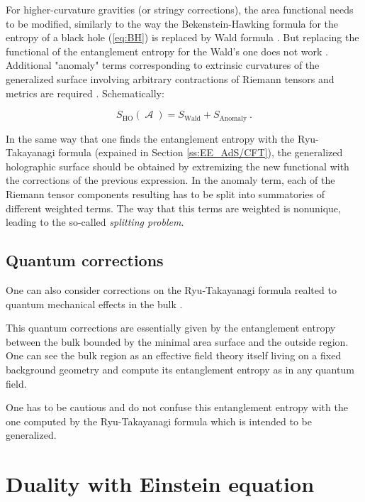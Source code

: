 \documentclass[lettersize,journal]{IEEEtran}
\providecommand{\eq}[2]{
    \begin{equation}
        #2
    \label{eq:#1}
    \end{equation}
}
\DeclareMathOperator{\calA}{\mathcal{A}}
\begin{document}
For higher-curvature gravities (or stringy corrections), the area functional needs to be modified, similarly to the way the Bekenstein-Hawking formula for the entropy of a black hole (\ref{eq:BH}) is replaced by Wald formula \cite{iyer_properties_1994}. But replacing the functional of the entanglement entropy for the Wald's one does not work \cite{bueno_holographic_2021}. Additional "anomaly" terms corresponding to extrinsic curvatures of the generalized surface involving arbitrary contractions of Riemann tensors and metrics are required \cite{dong_holographic_2014}. Schematically:
\eq{EE_HO}{
    S_{\text{HO}}(\calA) = S_{\text{Wald}} + S_{\text{Anomaly}} \ .
}

In the same way that one finds the entanglement entropy with the Ryu-Takayanagi formula (expained in Section \ref{ss:EE_AdS/CFT}), the generalized holographic surface should be obtained by extremizing the new functional with the corrections of the previous expression. In the anomaly term, each of the Riemann tensor components resulting has to be split into summatories of different weighted terms. The way that this terms are weighted is nonunique, leading to the so-called \textit{splitting problem}.


\subsection{Quantum corrections} \label{ss:QuantumC}

One can also consider corrections on the Ryu-Takayanagi formula realted to quantum mechanical effects in the bulk \cite{faulkner_quantum_2013}.

This quantum corrections are essentially given by the entanglement entropy between the bulk bounded by the minimal area surface and the outside region. One can see the bulk region as an effective field theory itself living on a fixed background geometry and compute its entanglement entropy as in any quantum field.

One has to be cautious and do not confuse this entanglement entropy with the one computed by the Ryu-Takayanagi formula which is intended to be generalized.








\section{Duality with Einstein equation} \label{s:EQ}
\end{document}
